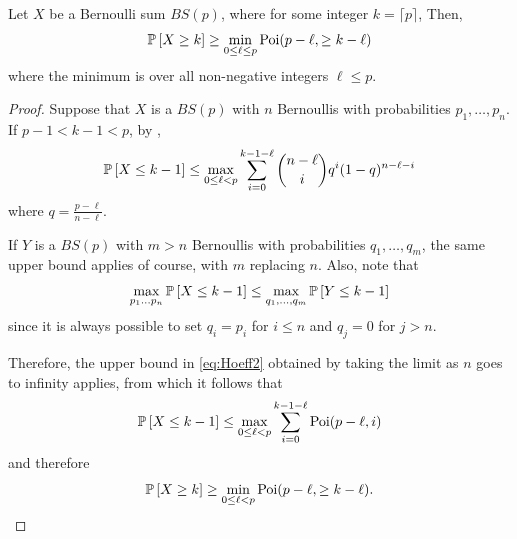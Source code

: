 \begin{lemma}\label{lem:SR>=}
Let $X$ be a Bernoulli sum $BS(p)$, where for some integer $k=\lceil p\rceil$,
Then,
$$\P{X\geq k} \geq \min_{0\leq \ell\leq p} \Poi(p-\ell,\geq k-\ell)$$
where the minimum is over all non-negative integers $\ell\leq p$.
\end{lemma}
\begin{proof}
% 
Suppose that  $X$ is a $BS(p)$ with $n$ Bernoullis with probabilities $p_1, \dots, p_n$. If $p-1 < k-1 < p$, by  \cite[Thm 4, (25)]{Hoe56},
\begin{equation}
\label{eq:Hoeff2}	
 \P{X\leq k-1} \leq  \max_{0\leq\ell<p} \sum_{i=0}^{k-1-\ell} {{n-\ell} \choose i} q^i(1-q)^{n-\ell-i}
\end{equation}
where $q=\frac{p-\ell}{n-\ell}$.

If $Y$ is a $BS(p)$ with $m > n$ Bernoullis
with probabilities $q_1, \ldots, q_m$, the same upper bound applies of course, with $m$ replacing $n$.
Also, note that
 $$\max_{p_1\ldots p_n} \P{ X \le k-1} \le \max_{q_1, \ldots, q_m} \P{ Y \le k-1}$$ since it is always possible to set $q_i = p_i$ for $i \le n$ and $q_j = 0$ for $j > n$.

Therefore, the upper bound in \eqref{eq:Hoeff2} obtained by taking the limit as $n$ goes to infinity applies, from which it follows that  
$$ \P{X\leq k-1} \leq  \max_{0\leq\ell<p} \sum_{i=0}^{k-1-\ell} \Poi(p-\ell, i)$$
and therefore
$$\P{X\geq k} \geq  \min_{0\leq\ell<p}  \Poi(p-\ell, \ge k-\ell). $$ 
\end{proof}


